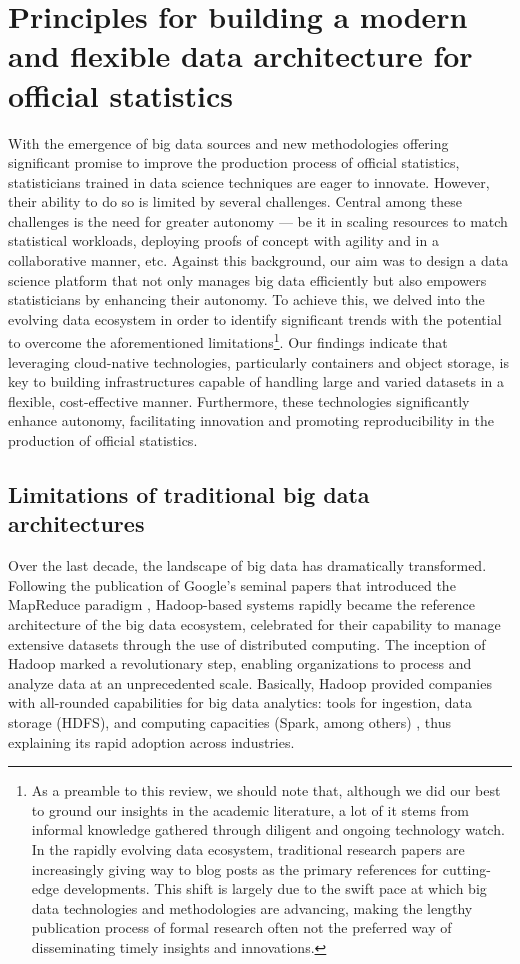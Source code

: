 \section{Principles for building a modern and flexible data architecture for official statistics}
\label{sec:principles}

With the emergence of big data sources and new methodologies offering significant promise to improve the production process of official statistics, statisticians trained in data science techniques are eager to innovate. However, their ability to do so is limited by several challenges. Central among these challenges is the need for greater autonomy — be it in scaling resources to match statistical workloads, deploying proofs of concept with agility and in a collaborative manner, etc. Against this background, our aim was to design a data science platform that not only manages big data efficiently but also empowers statisticians by enhancing their autonomy. To achieve this, we delved into the evolving data ecosystem in order to identify significant trends with the potential to overcome the aforementioned limitations\footnote{As a preamble to this review, we should note that, although we did our best to ground our insights in the academic literature, a lot of it stems from informal knowledge  gathered through diligent and ongoing technology watch. In the rapidly evolving data ecosystem, traditional research papers are increasingly giving way to blog posts as the primary references for cutting-edge developments. This shift is largely due to the swift pace at which big data technologies and methodologies are advancing, making the lengthy publication process of formal research often not the preferred way of disseminating timely insights and innovations.}. Our findings indicate that leveraging cloud-native technologies, particularly containers and object storage, is key to building infrastructures capable of handling large and varied datasets in a flexible, cost-effective manner. Furthermore, these technologies significantly enhance autonomy, facilitating innovation and promoting reproducibility in the production of official statistics.

\subsection{Limitations of traditional big data architectures}

Over the last decade, the landscape of big data has dramatically transformed. Following the publication of Google's seminal papers that introduced the MapReduce paradigm \cite{ghemawat2003google, dean2008mapreduce}, Hadoop-based systems rapidly became the reference architecture of the big data ecosystem, celebrated for their capability to manage extensive datasets through the use of distributed computing. The inception of Hadoop marked a revolutionary step, enabling organizations to process and analyze data at an unprecedented scale. Basically, Hadoop provided companies with all-rounded capabilities for big data analytics: tools for ingestion, data storage (HDFS), and computing capacities (Spark, among others) \cite{dhyani2014big}, thus explaining its rapid adoption across industries.

